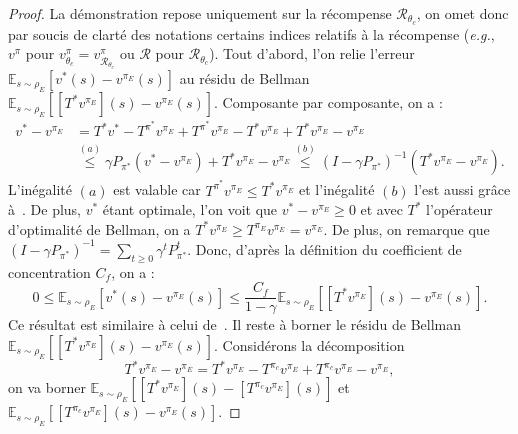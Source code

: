 \documentclass[english,utf8]{./hermes-journal}
\newcommand{\R}{\mathcal{R}}
\newcommand{\E}{\mathbb{E}}
\begin{document}
\begin{proof}
  La démonstration repose uniquement sur la récompense $\R_{\theta_c}$, on omet donc par soucis de clarté des notations certains indices relatifs à la récompense 
  (\textit{e.g.}, $v^\pi$ pour
  $v^\pi_{\theta_c}=v^\pi_{\R_{\theta_c}}$ ou $\R$ pour $\R_{\theta_c}$). Tout d'abord, l'on relie  l'erreur $\E_{s\sim\rho_E}[v^*(s)-v^{\pi_E}(s)]$ au résidu de Bellman $\E_{s\sim\rho_E}[[T^*v^{\pi_E}](s)-v^{\pi_E}(s)]$.
  Composante par composante, on a :
  \begin{align}
    v^* - v^{\pi_E} &= T^* v^*  - T^{\pi^*}v^{\pi_E} +
    T^{\pi^*}v^{\pi_E} - T^* v^{\pi_E} + T^* v^{\pi_E} - v^{\pi_E}
    \\
    &\stackrel{(a)}{\leq} \gamma P_{\pi^*}(v^*-v^{\pi_E}) + T^*
    v^{\pi_E} - v^{\pi_E}
    \stackrel{(b)}{\leq} (I-\gamma
    P_{\pi^*})^{-1} (T^* v^{\pi_E} - v^{\pi_E}).
  \end{align}
  L'inégalité $(a)$ est valable car $T^{\pi^*} v^{\pi_E}\leq T^*
  v^{\pi_E}$ et l'inégalité $(b)$ l'est aussi grâce à~\cite[Lemma~4.2]{Munos:2007}. De plus, $v^*$ étant optimale, l'on voit que  $v^*-v^{\pi_E}\geq 0$ et avec $T^*$ l'opérateur d'optimalité de Bellman, on a $T^* v^{\pi_E}\geq
  T^{\pi_E}v^{\pi_E}=v^{\pi_E}$. De plus, on remarque que 
  $(I-\gamma P_{\pi^*})^{-1} = \sum_{t\geq 0}\gamma^t P_{\pi^*}^t$.
  Donc, d'après la définition du coefficient de concentration 
  $C_f$, on a :
  \begin{equation}
    0\leq\E_{s\sim\rho_E}[v^*(s)-v^{\pi_E}(s)] \leq \frac{C_f}{1-\gamma}
    \E_{s\sim\rho_E}\left[[T^*v^{\pi_E}](s) - v^{\pi_E}(s)\right].
    \label{eq:proof:residual}
  \end{equation}
  Ce résultat est similaire à celui de~\cite[Theorem~4.2]{Munos:2007}. Il reste à borner le résidu de Bellman $\E_{s\sim\rho_E}[[T^*v^{\pi_E}](s) -
  v^{\pi_E}(s)]$. Considérons la décomposition
  \begin{equation}
    T^* v^{\pi_E} - v^{\pi_E} = T^* v^{\pi_E} - T^{\pi_c}v^{\pi_E}
    + T^{\pi_c}v^{\pi_E}- v^{\pi_E},
    \label{eq:proof:decomposition}
  \end{equation}
  on va borner  $\E_{s\sim\rho_E}[[T^* v^{\pi_E}](s) - [T^{\pi_c}v^{\pi_E}](s)]$
  et $\E_{s\sim\rho_E}[[T^{\pi_c}v^{\pi_E}](s) - v^{\pi_E}(s)]$.


\end{proof}
\end{document}
